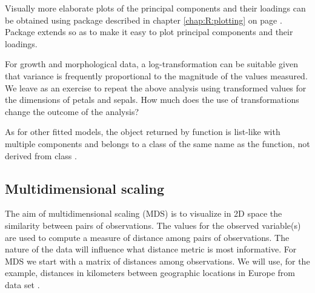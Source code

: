 \documentclass[krantz2]{krantz}\usepackage{knitr}
\begin{document}
Visually more elaborate plots of the principal components and their loadings can be obtained using package  described in chapter \ref{chap:R:plotting} on page \pageref{chap:R:plotting}. Package  extends  so as to make it easy to plot principal components and their loadings.

\begin{playground}
For growth and morphological data, a log-transformation can be suitable given that variance is frequently proportional to the magnitude of the values measured. We leave as an exercise to repeat the above analysis using transformed values for the dimensions of petals and sepals. How much does the use of transformations change the outcome of the analysis?
\end{playground}

\begin{advplayground}
As for other fitted models, the object returned by function  is list-like with multiple components and belongs to a class of the same name as the function, not derived from class .

\begin{knitrout}\footnotesize
{}\color{fgcolor}\begin{kframe}
\begin{alltt}
  \hlstd{=} \hlstd{)}
\end{alltt}
\end{kframe}
\end{knitrout}
\end{advplayground}


\subsection{Multidimensional scaling}\label{sec:stat:MDS}

The aim of multidimensional scaling (MDS) is to visualize in 2D space the similarity between pairs of observations. The values for the observed variable(s) are used to compute a measure of distance among pairs of observations. The nature of the data will influence what distance metric is most informative.
For MDS we start with a matrix of distances among observations. We will use, for the example, distances in kilometers between geographic locations in Europe from data set .
\end{document}
